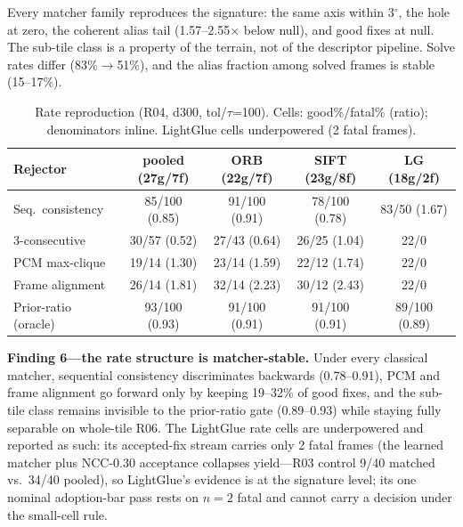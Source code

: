 \documentclass[journal]{IEEEtran}
\begin{document}
Every matcher family reproduces the signature: the same axis within 3$^{\circ}$, the hole at zero, the coherent alias tail (1.57--2.55$\times$ below null), and good fixes at null. The sub-tile class is a property of the terrain, not of the descriptor pipeline. Solve rates differ (83\%$\to$51\%), and the alias fraction among solved frames is stable (15--17\%).

\begin{table}[t]
\caption{Rate reproduction (R04, d300, tol/$\tau$=100). Cells: good\%/fatal\% (ratio); denominators inline. LightGlue cells underpowered (2 fatal frames).}
\label{tab:matcherrate}
\centering
\footnotesize
\setlength{\tabcolsep}{1.6pt}
\begin{tabular}{@{}lcccc@{}}
\toprule
Rejector & \shortstack{pooled\\(27g/7f)} & \shortstack{ORB\\(22g/7f)} & \shortstack{SIFT\\(23g/8f)} & \shortstack{LG\\(18g/2f)} \\
\midrule
Seq.\ consistency & 85/100 (0.85) & 91/100 (0.91) & 78/100 (0.78) & 83/50 (1.67) \\
3-consecutive & 30/57 (0.52) & 27/43 (0.64) & 26/25 (1.04) & 22/0 \\
PCM max-clique & 19/14 (1.30) & 23/14 (1.59) & 22/12 (1.74) & 22/0 \\
Frame alignment & 26/14 (1.81) & 32/14 (2.23) & 30/12 (2.43) & 22/0 \\
Prior-ratio (oracle) & 93/100 (0.93) & 91/100 (0.91) & 91/100 (0.91) & 89/100 (0.89) \\
\bottomrule
\end{tabular}
\end{table}

\textbf{Finding 6---the rate structure is matcher-stable.} Under every classical matcher, sequential consistency discriminates backwards (0.78--0.91), PCM and frame alignment go forward only by keeping 19--32\% of good fixes, and the sub-tile class remains invisible to the prior-ratio gate (0.89--0.93) while staying fully separable on whole-tile R06. The LightGlue rate cells are underpowered and reported as such: its accepted-fix stream carries only 2 fatal frames (the learned matcher plus NCC-0.30 acceptance collapses yield---R03 control 9/40 matched vs.\ 34/40 pooled), so LightGlue's evidence is at the signature level; its one nominal adoption-bar pass rests on $n=2$ fatal and cannot carry a decision under the small-cell rule.
\end{document}
